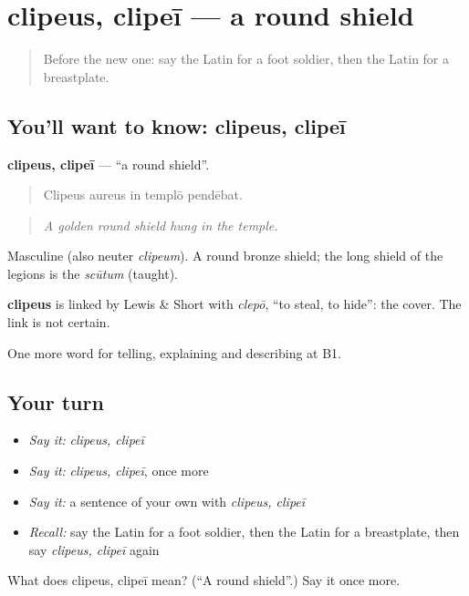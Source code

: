 \section[clipeus, clipeī]{clipeus, clipeī — a round shield}

\label{lesson:LA-C340-clipeus}



\begin{quote}
Before the new one: say the Latin for a foot soldier, then the Latin for a breastplate.
\end{quote}

\subsection*{You'll want to know: clipeus, clipeī}
\textbf{clipeus, clipeī} — \textquotedblleft{}a round shield\textquotedblright{}.

\begin{quote}
Clipeus aureus in templō pendēbat.
\end{quote}

\begin{quote}
\emph{A golden round shield hung in the temple.}
\end{quote}

Masculine (also neuter \emph{clipeum}). A round bronze shield; the long shield of the legions is the \emph{scūtum} (taught).

\begin{cousinweb}
\textbf{clipeus} is linked by Lewis \& Short with \emph{clepō}, \textquotedblleft{}to steal, to hide\textquotedblright{}: the cover. The link is not certain.
\end{cousinweb}

\begin{grammarlens}[title={What you've built}]
One more word for telling, explaining and describing at B1.
\end{grammarlens}

\subsection*{Your turn}
\begin{itemize}
\raggedright
  \item \emph{Say it:} \emph{clipeus, clipeī}
  \item \emph{Say it:} \emph{clipeus, clipeī}, once more
  \item \emph{Say it:} a sentence of your own with \emph{clipeus, clipeī}
  \item \emph{Recall:} say the Latin for a foot soldier, then the Latin for a breastplate, then say \emph{clipeus, clipeī} again
\end{itemize}

\begin{tcolorbox}[breakable,colback=teal!4,colframe=teal!35!black,title={Before you move on}]
What does clipeus, clipeī mean? (\textquotedblleft{}A round shield\textquotedblright{}.) Say it once more.
\end{tcolorbox}

